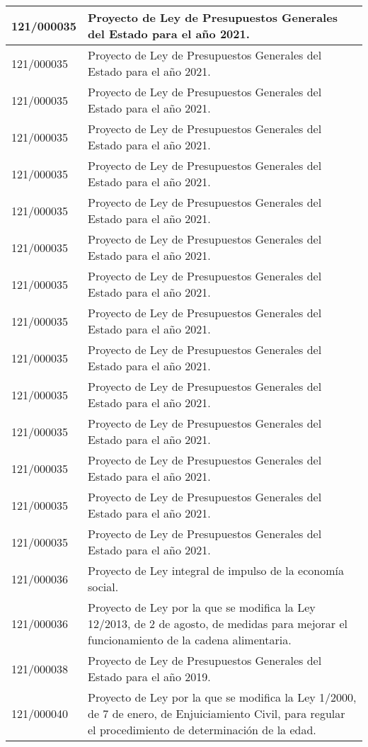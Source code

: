 {\begin{table}[H]
\begin{center}
\begin{tabularx}{\linewidth}{| l | X |}
\hline
121/000035 & Proyecto de Ley de Presupuestos Generales del Estado para el año 2021. \\
\hline
121/000035 & Proyecto de Ley de Presupuestos Generales del Estado para el año 2021. \\
\hline
121/000035 & Proyecto de Ley de Presupuestos Generales del Estado para el año 2021. \\
\hline
121/000035 & Proyecto de Ley de Presupuestos Generales del Estado para el año 2021. \\
\hline
121/000035 & Proyecto de Ley de Presupuestos Generales del Estado para el año 2021. \\
\hline
121/000035 & Proyecto de Ley de Presupuestos Generales del Estado para el año 2021. \\
\hline
121/000035 & Proyecto de Ley de Presupuestos Generales del Estado para el año 2021. \\
\hline
121/000035 & Proyecto de Ley de Presupuestos Generales del Estado para el año 2021. \\
\hline
121/000035 & Proyecto de Ley de Presupuestos Generales del Estado para el año 2021. \\
\hline
121/000035 & Proyecto de Ley de Presupuestos Generales del Estado para el año 2021. \\
\hline
121/000035 & Proyecto de Ley de Presupuestos Generales del Estado para el año 2021. \\
\hline
121/000035 & Proyecto de Ley de Presupuestos Generales del Estado para el año 2021. \\
\hline
121/000035 & Proyecto de Ley de Presupuestos Generales del Estado para el año 2021. \\
\hline
121/000035 & Proyecto de Ley de Presupuestos Generales del Estado para el año 2021. \\
\hline
121/000035 & Proyecto de Ley de Presupuestos Generales del Estado para el año 2021. \\
\hline
121/000036 & Proyecto de Ley integral de impulso de la economía social. \\
\hline
121/000036 & Proyecto de Ley por la que se modifica la Ley 12/2013, de 2 de agosto, de medidas para mejorar el funcionamiento de la cadena alimentaria. \\
\hline
121/000038 & Proyecto de Ley de Presupuestos Generales del Estado para el año 2019. \\
\hline
121/000040 & Proyecto de Ley por la que se modifica la Ley 1/2000, de 7 de enero, de Enjuiciamiento Civil, para regular el procedimiento de determinación de la edad. \\

\end{tabularx}
\end{center}
\end{table}}
